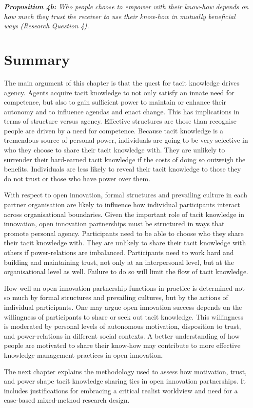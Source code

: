 \begin{tcolorbox}
\textit{\textbf{Proposition 4b:} Who people choose to empower with their know-how depends on how much they trust the receiver to use their know-how in mutually beneficial ways (Research Question 4).} 
\end{tcolorbox}

\section{Summary}

The main argument of this chapter is that the quest for tacit knowledge drives agency. Agents acquire tacit knowledge to not only satisfy an innate need for competence, but also to gain sufficient power to maintain or enhance their autonomy and to influence agendas and enact change. This has implications in terms of structure versus agency. Effective structures are those than recognise people are driven by a need for competence. Because tacit knowledge is a tremendous source of personal power, individuals are going to be very selective in who they choose to share their tacit knowledge with. They are unlikely to surrender their hard-earned tacit knowledge if the costs of doing so outweigh the benefits. Individuals are less likely to reveal their tacit knowledge to those they do not trust or those who have power over them. \medskip

With respect to open innovation, formal structures and prevailing culture in each partner organisation are likely to influence how individual participants interact across organisational boundaries. Given the important role of tacit knowledge in innovation, open innovation partnerships must be structured in ways that promote personal agency. Participants need to be able to choose who they share their tacit knowledge with. They are unlikely to share their tacit knowledge with others if power-relations are imbalanced. Participants need to work hard and building and maintaining trust, not only at an interpersonal level, but at the organisational level as well. Failure to do so will limit the flow of tacit knowledge. \medskip

How well an open innovation partnership functions in practice is determined not so much by formal structures and prevailing cultures, but by the actions of individual participants. One may argue open innovation success depends on the willingness of participants to share or seek out tacit knowledge. This willingness is moderated by personal levels of autonomous motivation, disposition to trust, and power-relations in different social contexts. A better understanding of how people are motivated to share their know-how may contribute to more effective knowledge management practices in open innovation.\medskip

The next chapter explains the methodology used to assess how motivation, trust, and power shape tacit knowledge sharing ties in open innovation partnerships. It includes justifications for embracing a critical realist worldview and need for a case-based mixed-method research design. 